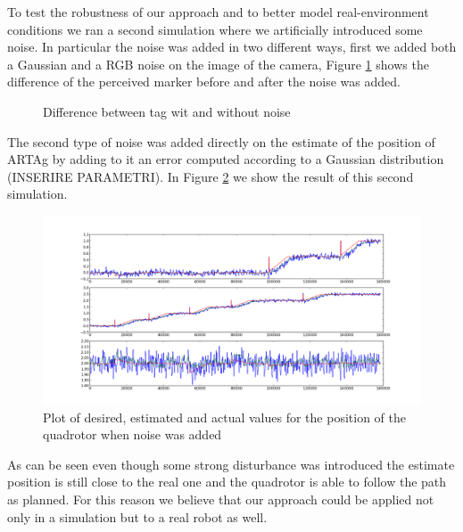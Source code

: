 To test the robustness of our approach and to better model real-environment conditions we ran a second simulation where we artificially introduced some noise. In particular the noise was added in two different ways, first we added both a Gaussian and a RGB noise on the image of the camera, Figure \ref{fig:artag} shows the difference of the perceived marker before and after the noise was added.

 \begin{figure}[!h]
 \centering
 \hspace{5mm}
 \caption{Difference between tag wit and without noise}
 \label{fig:artag}
 \end{figure}
 

\noindent The second type of noise was added directly on the estimate of the position of ARTAg by adding to it an error computed according to a Gaussian distribution (INSERIRE PARAMETRI). In Figure \ref{fig:plot_noise} we show the result of this second simulation.

\begin{figure}[h!]
  \centering
    \includegraphics[scale=0.35]{figs/plot_noise.png}
  \caption{Plot of desired, estimated and actual values for the position of the quadrotor when noise was added}
  \label{fig:plot_noise}
\end{figure}


As can be seen even though some strong disturbance was introduced the estimate position is still close to the real one and the quadrotor is able to follow the path as planned. For this reason we believe that our approach could be applied not only in a simulation but to a real robot as well.